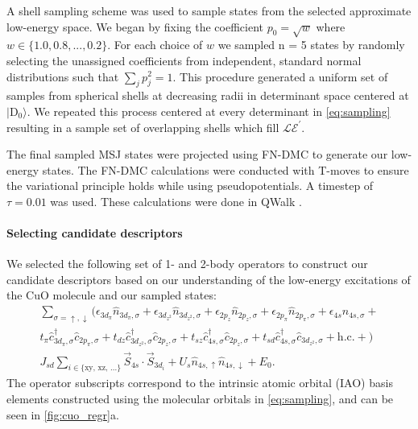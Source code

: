 \documentclass[12pt]{article}
\begin{document}
A shell sampling scheme was used to sample states from the selected approximate low-energy space.
We began by fixing the coefficient $p_0 = \sqrt{w}$ where $w \in \{1.0, 0.8, ..., 0.2\}$. 
For each choice of $w$ we sampled n = 5 states by randomly selecting the unassigned coefficients from independent, standard normal distributions such that $\sum_j p_j^2 = 1$. 
This procedure generated a uniform set of samples from spherical shells at decreasing radii in determinant space centered at $|\text{D}_0\rangle$.
We repeated this process centered at every determinant in \eqref{eq:sampling} resulting in a sample set of overlapping shells which fill $\mathcal{LE}^\prime$.

The final sampled MSJ states were projected using FN-DMC to generate our low-energy states.
The FN-DMC calculations were conducted with T-moves to ensure the variational principle holds while using pseudopotentials.
A timestep of $\tau = 0.01$ was used.
These calculations were done in QWalk \cite{Wagner2009}.

\paragraph{Selecting candidate descriptors}
We selected the following set of 1- and 2-body operators to construct our candidate descriptors based on our understanding of the low-energy excitations of the CuO molecule and our sampled states:
\begin{equation}
\begin{split}
\sum_{\sigma = \uparrow, \downarrow} \Bigg(\epsilon_{3d_\pi}\hat{n}_{3d_\pi,\sigma} + \epsilon_{3d_{z^2}}\hat{n}_{3d_{z^2},\sigma} +  \epsilon_{2p_z} \hat{n}_{2p_z,\sigma} + \epsilon_{2p_\pi}\hat{n}_{2p_\pi,\sigma} + \epsilon_{4s}\hat{n}_{4s,\sigma} +\\
t_\pi \hat{c}_{3d_\pi,\sigma}^\dagger \hat{c}_{2p_\pi,\sigma} + t_{dz} \hat{c}_{3d_{z^2},\sigma}^\dagger \hat{c}_{2p_z,\sigma}  + t_{sz}\hat{c}_{4s,\sigma}^\dagger \hat{c}_{2p_z,\sigma} + t_{sd}\hat{c}_{4s,\sigma}^\dagger \hat{c}_{3d_{z^2},\sigma} + \text{h.c.} + \Bigg)  \\
J_{sd}\sum_{i\in {\{\text{xy, xz, ...}}\}} \vec{S}_{4s} \cdot \vec{S}_{3d_i} + U_s \hat{n}_{4s,\uparrow}\hat{n}_{4s,\downarrow} + E_0.
\end{split}
\label{eq:models}
\end{equation}
The operator subscripts correspond to the intrinsic atomic orbital (IAO) basis elements constructed using the molecular orbitals in \eqref{eq:sampling}, and can be seen in \ref{fig:cuo_regr}a.
\end{document}
